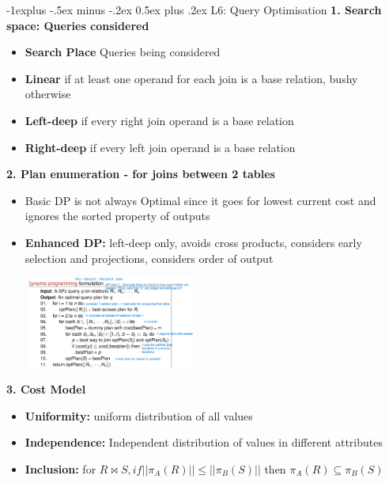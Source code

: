 \documentclass[10pt, landscape]{article}
\makeatletter
\renewcommand{\subsection}{\@startsection{subsection}{2}{0mm}%
                                {-1explus -.5ex minus -.2ex}%
                                {0.5ex plus .2ex}%
                                {\normalfont\normalsize\bfseries}}
\makeatother
\begin{document}
\begin{multicols}{4}


\subsection{L6: Query Optimisation}
\textbf{1. Search space: Queries considered} \\ 
\begin{itemize}
  \item \textbf{Search Place} Queries being considered
  \item \textbf{Linear} if at least one operand for each join is a base relation, bushy otherwise
  \item \textbf{Left-deep} if every right join operand is a base relation 
  \item \textbf{Right-deep} if every left join operand is a base relation
\end{itemize}

\textbf{2. Plan enumeration - for joins between 2 tables} \\
\begin{itemize}
  \item Basic DP is not always Optimal since it goes for lowest current cost and ignores the sorted property of outputs
  \item \textbf{Enhanced DP:} left-deep only, avoids cross products, considers early selection and projections, considers order of output
\end{itemize}
\includegraphics[width=7cm, height =3cm]{dp_2.png}

\textbf{3. Cost Model} \\
\begin{itemize}
  \item \textbf{Uniformity:} uniform distribution of all values
  \item \textbf{Independence:} Independent distribution of values in different attributes
  \item \textbf{Inclusion:} for $R\bowtie S, if ||\pi_A(R)|| \leq ||\pi_B(S)||$ then $\pi_A(R) \subseteq \pi_B(S)$
\end{itemize}


\end{multicols}
\end{document}
